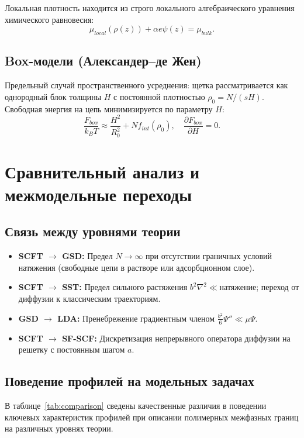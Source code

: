 \documentclass[12pt,a4paper]{article}
\begin{document}
Локальная плотность находится из строго локального алгебраического уравнения химического равновесия:
\begin{equation}
\mu_{local}(\rho(z)) + \alpha e \psi(z) = \mu_{bulk}.
\end{equation}

\subsection{Box-модели (Александер--де Жен)}
Предельный случай пространственного усреднения: щетка рассматривается как однородный блок толщины $H$ с постоянной плотностью $\rho_0 = N/(sH)$. Свободная энергия на цепь минимизируется по параметру $H$:
\begin{equation}
\frac{F_{box}}{k_B T} \approx \frac{H^2}{R_0^2} + N f_{int}(\rho_0), \quad \frac{\partial F_{box}}{\partial H} = 0.
\end{equation}

\section{Сравнительный анализ и межмодельные переходы}

\subsection{Связь между уровнями теории}
\begin{itemize}
    \item \textbf{SCFT $\to$ GSD:} Предел $N \to \infty$ при отсутствии граничных условий натяжения (свободные цепи в растворе или адсорбционном слое).
    \item \textbf{SCFT $\to$ SST:} Предел сильного растяжения $b^2 \nabla^2 \ll \text{натяжение}$; переход от диффузии к классическим траекториям.
    \item \textbf{GSD $\to$ LDA:} Пренебрежение градиентным членом $\frac{b^2}{6}\Psi'' \ll \mu \Psi$.
    \item \textbf{SCFT $\to$ SF-SCF:} Дискретизация непрерывного оператора диффузии на решетку с постоянным шагом $a$.
\end{itemize}

\subsection{Поведение профилей на модельных задачах}
В таблице~\ref{tab:comparison} сведены качественные различия в поведении ключевых характеристик профилей при описании полимерных межфазных границ на различных уровнях теории.
\end{document}
